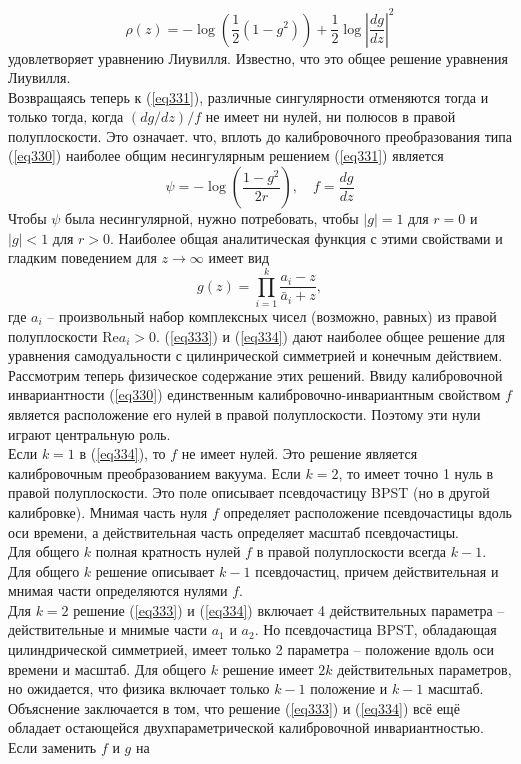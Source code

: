 \documentclass[12pt]{article}
\theoremstyle{definition}
\begin{document}
\begin{equation}
    \rho(z)=-\log\left(\frac{1}{2}(1-g^2)\right)+\frac{1}{2}\log\left|\frac{dg}{dz}\right|^2
\end{equation}
удовлетворяет уравнению Лиувилля. Известно, что это общее решение уравнения Лиувилля.\\
Возвращаясь теперь к (\ref{eq331}), различные сингулярности отменяются тогда и только тогда, когда $(dg/dz)/f$ не имеет ни нулей, ни полюсов в правой полуплоскости. Это означает. что, вплоть до калибровочного преобразования типа (\ref{eq330}) наиболее общим несингулярным решением (\ref{eq331}) является
\begin{equation}\label{eq333}
    \psi=-\log\left(\frac{1-g^2}{2r}\right),\quad f=\frac{dg}{dz}
\end{equation}
Чтобы $\psi$ была несингулярной, нужно потребовать, чтобы $|g|=1$ для $r = 0$ и $|g|<1$ для $r>0$. Наиболее общая аналитическая функция с этими свойствами и гладким поведением для $z\rightarrow\infty$ имеет вид
\begin{equation}\label{eq334}
    g(z)=\prod\limits_{i=1}^k\frac{a_i-z}{\bar{a}_i+z},
\end{equation}
где $a_i$ -- произвольный набор комплексных чисел (возможно, равных) из правой полуплоскости $\text{Re}a_i>0$. (\ref{eq333}) и (\ref{eq334}) дают наиболее общее решение для уравнения самодуальности с цилинрической симметрией и конечным действием.\\
Рассмотрим теперь физическое содержание этих решений. Ввиду калибровочной инвариантности (\ref{eq330}) единственным калибровочно-инвариантным свойством $f$ является расположение его нулей в правой полуплоскости. Поэтому эти нули играют центральную роль.\\
Если $k = 1$ в (\ref{eq334}), то $f$ не имеет нулей. Это решение является калибровочным преобразованием вакуума. Если $k = 2$, то имеет точно 1 нуль в правой полуплоскости. Это поле описывает псевдочастицу BPST (но в другой калибровке). Мнимая часть нуля $f$ определяет расположение псевдочастицы вдоль оси времени, а действительная часть определяет масштаб псевдочастицы.\\
Для общего $k$ полная кратность нулей $f$ в правой полуплоскости всегда $k-1$. Для общего $k$ решение описывает $k - 1$ псевдочастиц, причем действительная и мнимая части определяются нулями $f$.\\
Для $k = 2$ решение (\ref{eq333}) и (\ref{eq334}) включает 4 действительных параметра -- действительные и мнимые части $a_1$ и $a_2$. Но псевдочастица BPST, обладающая цилиндрической симметрией, имеет только 2 параметра -- положение вдоль оси времени и масштаб. Для общего $k$ решение имеет $2k$ действительных параметров, но ожидается, что физика включает только $k - 1$ положение и $k - 1$ масштаб. Объяснение заключается в том, что решение (\ref{eq333}) и (\ref{eq334}) всё ещё обладает остающейся двухпараметрической калибровочной инвариантностью. Если заменить $f$ и $g$ на
\end{document}
